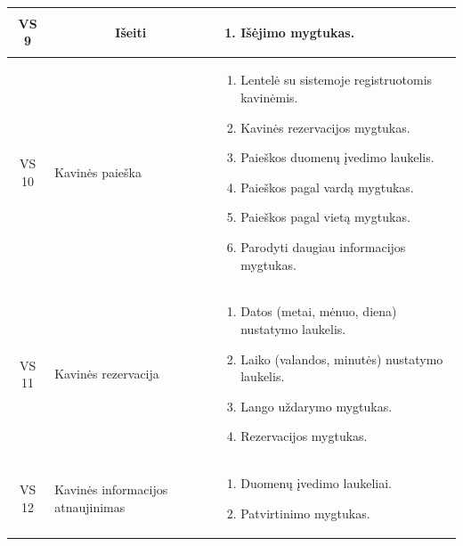 \documentclass{VUMIFPSkursinis}
\begin{document}
\begin{center}
\begin{longtable}{|p{2cm}|p{}|p{}|}
	\hline 	
		\multicolumn{1}{|c|}{VS 9}&
		\multicolumn{1}{|c|}{Išeiti}&
		\multicolumn{1}{|p{8,6cm}|}{
			\begin{enumerate}
				\item Išėjimo mygtukas.
			\end{enumerate}}\\
	
	\hline	
		\multicolumn{1}{|c|}{VS 10}&
		{Kavinės paieška}&
		\multicolumn{1}{|p{9,2cm}|}{
			\begin{enumerate}
				\item Lentelė su sistemoje registruotomis kavinėmis.
				\item Kavinės rezervacijos mygtukas.
				\item Paieškos duomenų įvedimo laukelis.
				\item Paieškos pagal vardą mygtukas.
				\item Paieškos pagal vietą mygtukas.
				\item Parodyti daugiau informacijos mygtukas.
			\end{enumerate}}\\
	
	\hline 	
		\multicolumn{1}{|c|}{VS 11}&
		{Kavinės rezervacija}&
		\multicolumn{1}{|p{9,2cm}|}{
			\begin{enumerate}
				\item Datos (metai, mėnuo, diena) nustatymo laukelis.
				\item Laiko (valandos, minutės) nustatymo laukelis.
				\item Lango uždarymo mygtukas.
				\item Rezervacijos mygtukas.
			\end{enumerate}}\\
	
	\hline
		\multicolumn{1}{|c|}{VS 12}& 	
		{Kavinės informacijos atnaujinimas}&
		\multicolumn{1}{|p{8,6cm}|}{
			\begin{enumerate}
				\item Duomenų įvedimo laukeliai.
				\item Patvirtinimo mygtukas.
			\end{enumerate}}\\
	
	\hline
	
	
	\end{longtable}

\end{center}

\pagebreak
\end{document}
